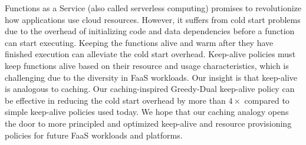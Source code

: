 
Functions as a Service (also called serverless computing) promises to revolutionize how applications use cloud resources. 
%
However, it suffers from cold start problems due to the overhead of initializing code and data dependencies before a function can start executing. 
%
Keeping the functions alive and warm after they have finished execution can alleviate the cold start overhead. 
%
Keep-alive policies must keep functions alive based on their resource and usage characteristics, which is challenging due to the diversity in FaaS workloads. 
%
Our insight is that keep-alive is analogous to caching.
%
Our caching-inspired Greedy-Dual keep-alive policy can be effective in reducing the cold start overhead by more than $4\times$ compared to simple keep-alive policies used today. 
%
We hope that our caching analogy opens the door to more principled and optimized keep-alive and resource provisioning policies for future FaaS workloads and platforms. 



